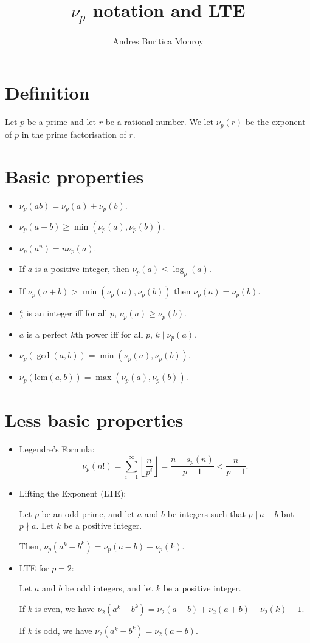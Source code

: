 \documentclass{article}
\title{$\nu_p$ notation and LTE}
\author{Andres Buritica Monroy}
\date{}
\newcommand\lcm{\mathrm{lcm}}
\begin{document}
\maketitle
\section{Definition}
Let $p$ be a prime and let $r$ be a rational number. We let $\nu_p(r)$ be the
exponent of $p$ in the prime factorisation of $r$.
\section{Basic properties}
\begin{itemize}
	\item $\nu_p(ab)=\nu_p(a)+\nu_p(b)$.
	\item $\nu_p(a+b)\ge\min(\nu_p(a),\nu_p(b))$.
	\item $\nu_p(a^n)=n\nu_p(a)$.
	\item If $a$ is a positive integer, then $\nu_p(a)\le\log_p(a)$.
	\item If $\nu_p(a+b)>\min(\nu_p(a),\nu_p(b))$ then $\nu_p(a)=\nu_p(b)$.
	\item $\frac ab$ is an integer iff for all $p$, $\nu_p(a)\ge\nu_p(b)$.
	\item $a$ is a perfect $k$th power iff for all $p$, $k\mid\nu_p(a)$.
	\item $\nu_p(\gcd(a,b))=\min(\nu_p(a),\nu_p(b))$.
	\item $\nu_p(\lcm(a,b))=\max(\nu_p(a),\nu_p(b))$.
\end{itemize}
\section{Less basic properties}
\begin{itemize}
	\item Legendre's Formula:
	      \[\nu_p(n!)=\sum_{i=1}^\infty\left\lfloor\frac
		      n{p^i}\right\rfloor=\frac{n-s_p(n)}{p-1}<\frac
		      n{p-1}.\]
	\item Lifting the Exponent (LTE):

	      Let $p$ be an odd prime, and let $a$ and $b$ be integers such that $p\mid
		      a-b$ but $p\nmid a$. Let $k$ be a positive integer.

	      Then, $\nu_p\left(a^k-b^k\right)=\nu_p(a-b)+\nu_p(k)$.
	\item LTE for $p=2$:

	      Let $a$ and $b$ be odd integers, and let $k$ be a positive integer.

	      If $k$ is even, we have $\nu_2(a^k-b^k)=\nu_2(a-b)+\nu_2(a+b)+\nu_2(k)-1$.

	      If $k$ is odd, we have $\nu_2(a^k-b^k)=\nu_2(a-b)$.
\end{itemize}
\end{document}
